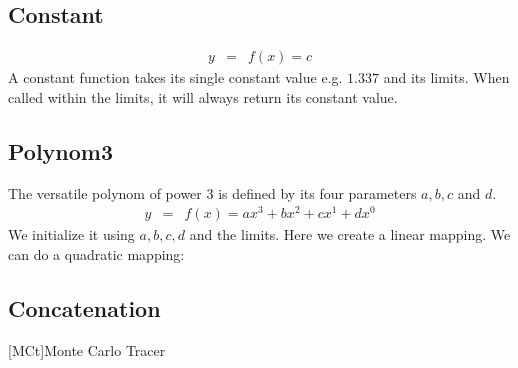 \documentclass[review]{elsarticle}
\begin{document}
\subsection{Constant}
\begin{eqnarray}
    y &=& f(x) = c
\end{eqnarray}
%
A constant function takes its single constant value e.g. $1.337$ and its limits.
%
%
When called within the limits, it will always return its constant value.
%
%
\subsection{Polynom3}
The versatile polynom of power 3 is defined by its four parameters $a,b,c$ and $d$.
\begin{eqnarray}
    y &=& f(x) = ax^3 + bx^2 + cx^1 + dx^0
\end{eqnarray}
%
We initialize it using $a,b,c,d$ and the limits. Here we create a linear mapping.
%
We can do a quadratic mapping:
%
\subsection{Concatenation}

\begin{acronym}
    [MCt]{Monte Carlo Tracer}
\end{acronym}
\end{document}
